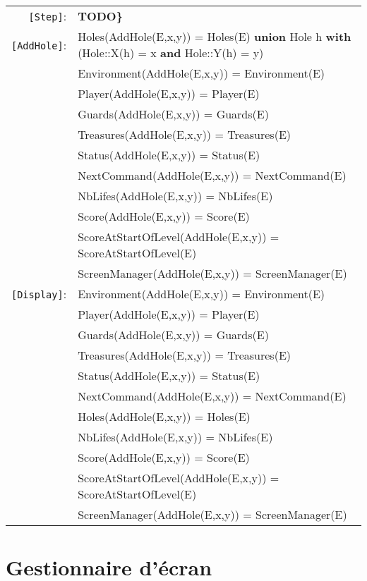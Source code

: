 \documentclass[7pt]{article}
\begin{document}
\begin{tabular}{rl}
       \texttt{[Step]}: & \textbf{TODO\}
} \\
    \texttt{[AddHole]}: & Holes(AddHole(E,x,y)) = Holes(E) \textbf{union} Hole h \textbf{ with} (Hole::X(h) = x \textbf{and} Hole::Y(h) = y) \\
       & Environment(AddHole(E,x,y)) = Environment(E) \\
       & Player(AddHole(E,x,y)) = Player(E) \\
       & Guards(AddHole(E,x,y)) = Guards(E) \\
       & Treasures(AddHole(E,x,y)) = Treasures(E) \\
       & Status(AddHole(E,x,y)) = Status(E) \\
       & NextCommand(AddHole(E,x,y)) = NextCommand(E) \\
       & NbLifes(AddHole(E,x,y)) = NbLifes(E) \\
       & Score(AddHole(E,x,y)) = Score(E) \\
       & ScoreAtStartOfLevel(AddHole(E,x,y)) = ScoreAtStartOfLevel(E) \\
       & ScreenManager(AddHole(E,x,y)) = ScreenManager(E) \\
       
       \texttt{[Display]}: & Environment(AddHole(E,x,y)) = Environment(E) \\
       & Player(AddHole(E,x,y)) = Player(E) \\
       & Guards(AddHole(E,x,y)) = Guards(E) \\
       & Treasures(AddHole(E,x,y)) = Treasures(E) \\
       & Status(AddHole(E,x,y)) = Status(E) \\
       & NextCommand(AddHole(E,x,y)) = NextCommand(E) \\
       & Holes(AddHole(E,x,y)) = Holes(E) \\
       & NbLifes(AddHole(E,x,y)) = NbLifes(E) \\
       & Score(AddHole(E,x,y)) = Score(E) \\
       & ScoreAtStartOfLevel(AddHole(E,x,y)) = ScoreAtStartOfLevel(E) \\
       & ScreenManager(AddHole(E,x,y)) = ScreenManager(E) \\

\end{tabular}
\newpage

\section*{Gestionnaire d'écran}
\end{document}
